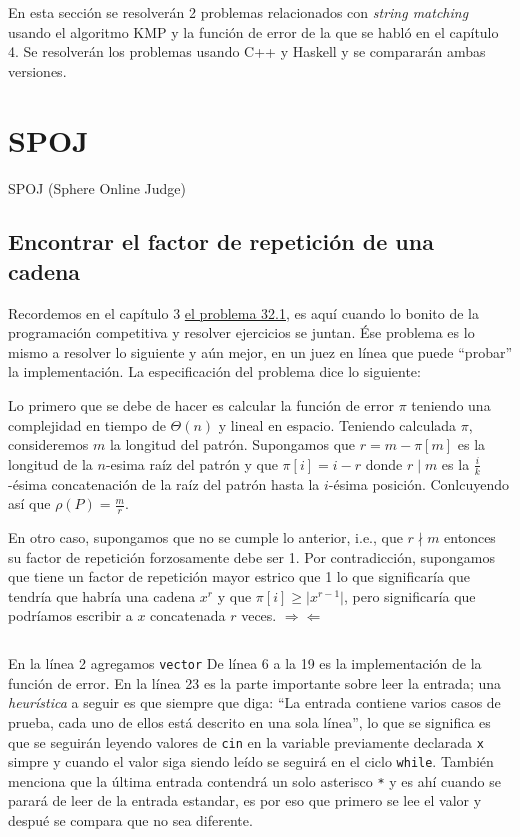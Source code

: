 En esta sección se resolverán 2 problemas relacionados con \textit{string matching} usando el
algoritmo KMP y la función de error de la que se habló en el capítulo 4. Se resolverán los
problemas usando C++ y Haskell y se compararán ambas versiones.


\section{SPOJ}
SPOJ (Sphere Online Judge)

\subsection{Encontrar el factor de repetición de una cadena}
Recordemos en el capítulo 3 \hyperlink{repetition_factor}{el problema 32.1}, es aquí cuando lo
bonito de la programación competitiva y resolver ejercicios se juntan. Ése problema es lo mismo
a resolver lo siguiente y aún mejor, en un juez en línea que puede ``probar'' la implementación.
La especificación del problema dice lo siguiente: 

Lo primero que se debe de hacer es calcular la función de error $\pi$ teniendo una complejidad en
tiempo de $\Theta(n)$ y lineal en espacio. Teniendo calculada $\pi$, consideremos $m$ la longitud
del patrón. Supongamos que $r = m - \pi[m]$ es la longitud de la $n$-esima raíz del patrón y que
$\pi[i] = i - r$ donde $r \mid m$ es la $\frac{i}{k}$-ésima concatenación de la raíz del patrón
hasta la $i$-ésima posición. Conlcuyendo así que $\rho(P) = \frac{m}{r}$.

En otro caso, supongamos que no se cumple lo anterior, i.e., que $r \nmid m$ entonces su factor de
repetición forzosamente debe ser 1. Por contradicción, supongamos que tiene un factor de repetición
mayor estrico que 1 lo que significaría que tendría que habría una cadena $x^r$ y que
$\pi[i] \geq \vert x^{r-1} \vert$, pero significaría que podríamos escribir a $x$ concatenada $r$
veces. $\Rightarrow\!\Leftarrow$



\inputminted[linenos, frame=lines]{cpp}{problemas/cpp/FINDSR.cpp}
\pagebreak

En la línea 2 agregamos \texttt{vector} %
De línea 6 a la 19 es la implementación de la función de error.
En la línea 23 es la parte importante sobre leer la entrada; una \textit{heurística} a seguir es que
siempre que diga: ``La entrada contiene varios casos de prueba, cada uno de ellos está descrito en una sola línea'', lo 
que se significa es que se seguirán leyendo valores de \texttt{cin} en la variable previamente declarada \texttt{x} simpre y cuando
el valor siga siendo leído se seguirá en el ciclo \texttt{while}.
También menciona que la última entrada contendrá un solo asterisco \texttt{*} y es ahí cuando se parará de leer de la entrada estandar,
es por eso que primero se lee el valor y despué se compara que no sea diferente.

